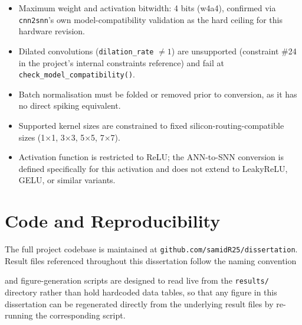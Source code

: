 \begin{itemize}
    \item Maximum weight and activation bitwidth: 4 bits (w4a4), confirmed via \texttt{cnn2snn}'s own model-compatibility validation as the hard ceiling for this hardware revision.
    \item Dilated convolutions (\texttt{dilation\_rate} $\neq 1$) are unsupported (constraint \#24 in the project's internal constraints reference) and fail at \texttt{check\_model\_compatibility()}.
    \item Batch normalisation must be folded or removed prior to conversion, as it has no direct spiking equivalent.
    \item Supported kernel sizes are constrained to fixed silicon-routing-compatible sizes (1$\times$1, 3$\times$3, 5$\times$5, 7$\times$7).
    \item Activation function is restricted to ReLU; the ANN-to-SNN conversion is defined specifically for this activation and does not extend to LeakyReLU, GELU, or similar variants.
\end{itemize}

\section{Code and Reproducibility}

The full project codebase is maintained at \texttt{github.com/samidR25/dissertation}. Result files referenced throughout this dissertation follow the naming convention


\noindent and figure-generation scripts are designed to read live from the \texttt{results/} directory rather than hold hardcoded data tables, so that any figure in this dissertation can be regenerated directly from the underlying result files by re-running the corresponding script.

